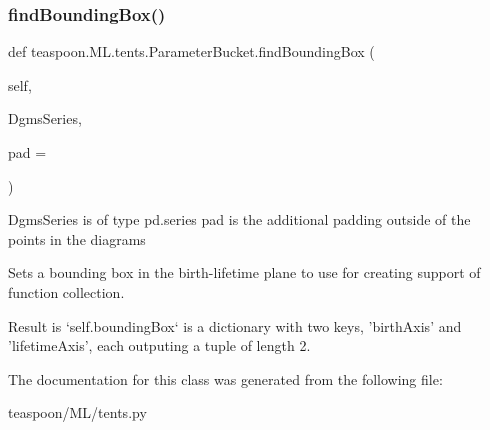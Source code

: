 \subsubsection{\texorpdfstring{find\+Bounding\+Box()}{findBoundingBox()}}
{\footnotesize\ttfamily def teaspoon.\+M\+L.\+tents.\+Parameter\+Bucket.\+find\+Bounding\+Box (\begin{DoxyParamCaption}\item[{}]{self,  }\item[{}]{Dgms\+Series,  }\item[{}]{pad = {} }\end{DoxyParamCaption})}

\begin{DoxyVerb}DgmsSeries is of type pd.series
pad is the additional padding outside of the points in the diagrams


Sets a bounding box in the birth-lifetime plane
to use for creating support of function collection.

Result is `self.boundingBox` is a dictionary with
two keys, 'birthAxis' and 'lifetimeAxis', each outputing
a tuple of length 2.\end{DoxyVerb}
 

The documentation for this class was generated from the following file\+:\begin{DoxyCompactItemize}
\item 
teaspoon/\+M\+L/tents.\+py\end{DoxyCompactItemize}
